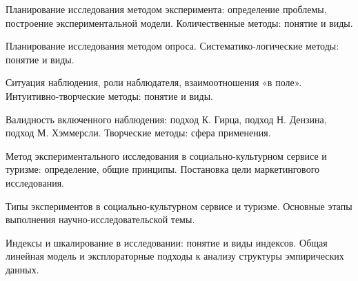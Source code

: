 \documentclass[
	14pt,
	a4paper,
	]
	{scrartcl}
\begin{document}
\vfill
\z Планирование исследования методом эксперимента: определение проблемы, построение экспериментальной модели.
 \vfill
\z Количественные методы: понятие и виды.
 \vfill

\vfill

\newpage


\shapk
{}
\setcounter{zad}{0}

\vfill
\z Планирование исследования методом опроса.
 \vfill
\z Систематико-логические методы: понятие и виды.
 \vfill

\vfill

\newpage


\shapk
{}
\setcounter{zad}{0}

\vfill
\z Ситуация наблюдения, роли наблюдателя, взаимоотношения «в поле».
 \vfill
\z Интуитивно-творческие методы: понятие и виды.
 \vfill

\vfill

\newpage


\shapk
{}
\setcounter{zad}{0}

\vfill
\z Валидность включенного наблюдения: подход К. Гирца, подход Н. Дензина, подход М. Хэммерсли.
 \vfill
\z Творческие методы: сфера применения.
 \vfill

\vfill

\newpage


\shapk
{}
\setcounter{zad}{0}

\vfill
\z Метод экспериментального исследования в социально-культурном сервисе и туризме: определение, общие принципы.
 \vfill
\z Постановка цели маркетингового исследования.
 \vfill

\vfill

\newpage


\shapk
{}
\setcounter{zad}{0}

\vfill
\z Типы экспериментов в социально-культурном сервисе и туризме.
 \vfill
\z Основные этапы выполнения научно-исследовательской темы.
 \vfill

\vfill

\newpage


\shapk
{}
\setcounter{zad}{0}

\vfill
\z Индексы и шкалирование в исследовании: понятие и виды индексов.
 \vfill
\z Общая линейная модель и эксплораторные подходы к анализу структуры эмпирических данных.
 \vfill

\vfill
\end{document}
